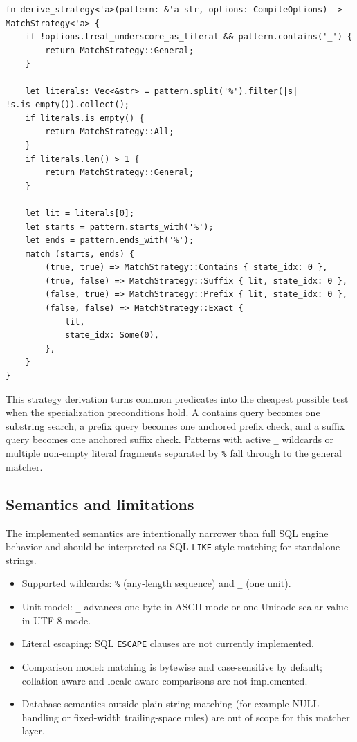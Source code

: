\documentclass[11pt]{article}
\begin{document}
\begin{lstlisting}[style=ruststyle]
fn derive_strategy<'a>(pattern: &'a str, options: CompileOptions) -> MatchStrategy<'a> {
    if !options.treat_underscore_as_literal && pattern.contains('_') {
        return MatchStrategy::General;
    }

    let literals: Vec<&str> = pattern.split('%').filter(|s| !s.is_empty()).collect();
    if literals.is_empty() {
        return MatchStrategy::All;
    }
    if literals.len() > 1 {
        return MatchStrategy::General;
    }

    let lit = literals[0];
    let starts = pattern.starts_with('%');
    let ends = pattern.ends_with('%');
    match (starts, ends) {
        (true, true) => MatchStrategy::Contains { state_idx: 0 },
        (true, false) => MatchStrategy::Suffix { lit, state_idx: 0 },
        (false, true) => MatchStrategy::Prefix { lit, state_idx: 0 },
        (false, false) => MatchStrategy::Exact {
            lit,
            state_idx: Some(0),
        },
    }
}
\end{lstlisting}

This strategy derivation turns common predicates into the cheapest possible test when the specialization preconditions hold. A contains query becomes one substring search, a prefix query becomes one anchored prefix check, and a suffix query becomes one anchored suffix check. Patterns with active \texttt{\_} wildcards or multiple non-empty literal fragments separated by \texttt{\%} fall through to the general matcher.

\subsection{Semantics and limitations}

The implemented semantics are intentionally narrower than full SQL engine behavior and should be interpreted as SQL-\texttt{LIKE}-style matching for standalone strings.

\begin{itemize}
    \item Supported wildcards: \texttt{\%} (any-length sequence) and \texttt{\_} (one unit).
    \item Unit model: \texttt{\_} advances one byte in ASCII mode or one Unicode scalar value in UTF-8 mode.
    \item Literal escaping: SQL \texttt{ESCAPE} clauses are not currently implemented.
    \item Comparison model: matching is bytewise and case-sensitive by default; collation-aware and locale-aware comparisons are not implemented.
    \item Database semantics outside plain string matching (for example NULL handling or fixed-width trailing-space rules) are out of scope for this matcher layer.
\end{itemize}
\end{document}
